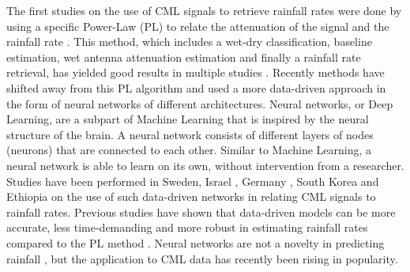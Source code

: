 \documentclass[twocolumn, 10pt, a4paper]{article}
\begin{document}
	The first studies on the use of CML signals to retrieve rainfall rates were done by using a specific Power-Law (PL) to relate the attenuation of the signal and the rainfall rate \cite{Overeem2011,Leijnse2007}. This method, which includes a wet-dry classification, baseline estimation, wet antenna attenuation estimation and finally a rainfall rate retrieval, has yielded good results in multiple studies \cite{deVos2019,Graf2020,Fencl2017}. Recently methods have shifted away from this PL algorithm and used a more data-driven approach in the form of neural networks of different architectures. Neural networks, or Deep Learning, are a subpart of Machine Learning that is inspired by the neural structure of the brain. A neural network consists of different layers of nodes (neurons) that are connected to each other. Similar to Machine Learning, a neural network is able to learn on its own, without intervention from a researcher. Studies have been performed in Sweden, Israel \cite{Habi2019}, Germany \cite{Polz2020}, South Korea and Ethiopia \cite{Diba2021} on the use of such data-driven networks in relating CML signals to rainfall rates. Previous studies have shown that data-driven models can be more accurate, less time-demanding and more robust in estimating rainfall rates compared to the PL method \cite{Polz2020,Pudashine2020}. Neural networks are not a novelty in predicting rainfall \cite{French1992}, but the application to CML data has recently been rising in popularity.
		
\end{document}
